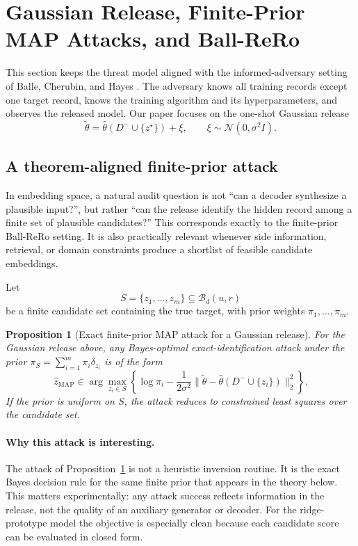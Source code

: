 \documentclass[conference,compsoc]{IEEEtran}
\newtheorem{proposition}{Proposition}
\newcommand{\ball}[2]{\mathcal{B}_{#1}(#2)}
\begin{document}
\section{Gaussian Release, Finite-Prior MAP Attacks, and Ball-ReRo}
\label{sec:gaussian-rero}

This section keeps the threat model aligned with the informed-adversary setting of Balle, Cherubin, and Hayes \cite{balle2022informed}. The adversary knows all training records except one target record, knows the training algorithm and its hyperparameters, and observes the released model. Our paper focuses on the one-shot Gaussian release
\[
\widetilde\theta = \widehat\theta(D^-\cup\{z^\star\})+\xi,
\qquad
\xi\sim\mathcal{N}(0,\sigma^2 I).
\]

\subsection{A theorem-aligned finite-prior attack}

In embedding space, a natural audit question is not ``can a decoder synthesize a plausible input?'', but rather ``can the release identify the hidden record among a finite set of plausible candidates?'' This corresponds exactly to the finite-prior Ball-ReRo setting. It is also practically relevant whenever side information, retrieval, or domain constraints produce a shortlist of feasible candidate embeddings.

Let
\[
S=\{z_1,\dots,z_m\}\subseteq \ball{d}{u,r}
\]
be a finite candidate set containing the true target, with prior weights $\pi_1,\dots,\pi_m$.

\begin{proposition}[Exact finite-prior MAP attack for a Gaussian release]
\label{prop:finite-map}
For the Gaussian release above, any Bayes-optimal exact-identification attack under the prior $\pi_S=\sum_{i=1}^m \pi_i\delta_{z_i}$ is of the form
\[
\widehat z_{\mathrm{MAP}}
\in
\arg\max_{z_i\in S}
\left\{
\log \pi_i
-
\frac{1}{2\sigma^2}
\bigl\|
\widetilde\theta-\widehat\theta(D^-\cup\{z_i\})
\bigr\|_2^2
\right\}.
\]
If the prior is uniform on $S$, the attack reduces to constrained least squares over the candidate set.
\end{proposition}

\paragraph{Why this attack is interesting.}
The attack of Proposition~\ref{prop:finite-map} is not a heuristic inversion routine. It is the exact Bayes decision rule for the same finite prior that appears in the theory below. This matters experimentally: any attack success reflects information in the release, not the quality of an auxiliary generator or decoder. For the ridge-prototype model the objective is especially clean because each candidate score can be evaluated in closed form.
\end{document}
